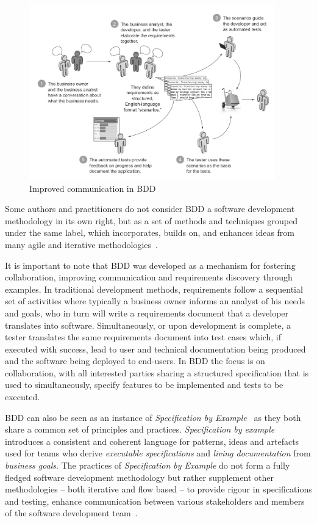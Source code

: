 \documentclass[dissertation,final]{softeng}
\begin{document}
\begin{figure}[h]
\includegraphics[width=0.95\textwidth]{communication_in_bdd}
\centering
\caption[Improved communication in BDD]{Improved communication in BDD~\citep{Smart201410}}
\label{fig:communication_in_bdd}
\end{figure}

Some authors and practitioners do not consider BDD a software development methodology in its own right, but as a set of methods and techniques grouped under the same label, which incorporates, builds on, and enhances ideas from many agile and iterative methodologies~\citep{Smart201410}.

It is important to note that BDD was developed as a mechanism for fostering collaboration, improving communication and requirements discovery through examples. In traditional development methods, requirements follow a sequential set of activities where typically a business owner informs an analyst of his needs and goals, who in turn will write a requirements document that a developer translates into software. Simultaneously, or upon development is complete, a tester translates the same requirements document into test cases which, if executed with success, lead to user and technical documentation being produced and the software being deployed to end-users. In BDD the focus is on collaboration, with all interested parties sharing a structured specification that is used to simultaneously, specify features to be implemented and tests to be executed.

BDD can also be seen as an instance of \emph{Specification by Example}~\citep{Adzic201106} as they both share a common set of principles and practices. \emph{Specification by example} introduces a consistent and coherent language for patterns, ideas and artefacts used for teams who derive \emph{executable specifications} and \emph{living documentation} from \emph{business goals}. The practices of \emph{Specification by Example} do not form a fully fledged software development methodology but rather supplement other methodologies -- both iterative and flow based -- to provide rigour in specifications and testing, enhance communication between various stakeholders and members of the software development team~\citep{Adzic201106}.
\end{document}
